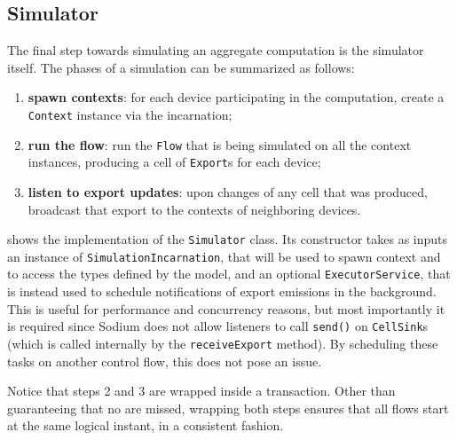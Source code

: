 \subsection{Simulator}
\label{sec:simulator}

The final step towards simulating an aggregate computation is the simulator itself.
%
The phases of a simulation can be summarized as follows:
%
\begin{enumerate}
	\item \textbf{spawn contexts}: for each device participating in the computation, create a \texttt{Context} instance via the incarnation;
	\item \textbf{run the flow}: run the \texttt{Flow} that is being simulated on all the context instances, producing a cell of \texttt{Export}s for each device;
	\item \textbf{listen to export updates}: upon changes of any cell that was produced, broadcast that export to the contexts of neighboring devices.
\end{enumerate}

 shows the implementation of the \texttt{Simulator} class.
%
Its constructor takes as inputs an instance of \texttt{SimulationIncarnation}, that will be used to spawn context and to access the types defined by the model, and an optional \texttt{ExecutorService}, that is instead used to schedule notifications of export emissions in the background.
%
This is useful for performance and concurrency reasons, but most importantly it is required since Sodium does not allow listeners to call \texttt{send()} on \texttt{CellSink}s (which is called internally by the \texttt{receiveExport} method).
%
By scheduling these tasks on another control flow, this does not pose an issue.
%


Notice that steps 2 and 3 are wrapped inside a transaction.
%
Other than guaranteeing that no  are missed, wrapping both steps ensures that all flows start at the same logical instant, in a consistent fashion.
